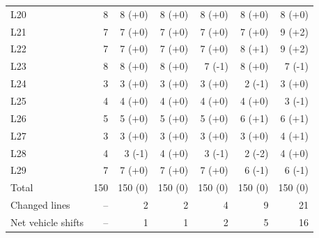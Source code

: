 \documentclass[a4paper,fleqn]{cas-sc}
\begin{document}
\begin{table}[p]
\begin{tabular}{lrrrrrr}
L20 & 8 & 8 (+0) & 8 (+0) & 8 (+0) & 8 (+0) & 8 (+0) \\
L21 & 7 & 7 (+0) & 7 (+0) & 7 (+0) & 7 (+0) & 9 (+2) \\
L22 & 7 & 7 (+0) & 7 (+0) & 7 (+0) & 8 (+1) & 9 (+2) \\
L23 & 8 & 8 (+0) & 8 (+0) & 7 (-1) & 8 (+0) & 7 (-1) \\
L24 & 3 & 3 (+0) & 3 (+0) & 3 (+0) & 2 (-1) & 3 (+0) \\
L25 & 4 & 4 (+0) & 4 (+0) & 4 (+0) & 4 (+0) & 3 (-1) \\
L26 & 5 & 5 (+0) & 5 (+0) & 5 (+0) & 6 (+1) & 6 (+1) \\
L27 & 3 & 3 (+0) & 3 (+0) & 3 (+0) & 3 (+0) & 4 (+1) \\
L28 & 4 & 3 (-1) & 4 (+0) & 3 (-1) & 2 (-2) & 4 (+0) \\
L29 & 7 & 7 (+0) & 7 (+0) & 7 (+0) & 6 (-1) & 6 (-1) \\
\midrule
Total & 150 & 150 (0) & 150 (0) & 150 (0) & 150 (0) & 150 (0) \\
Changed lines & -- & 2 & 2 & 4 & 9 & 21 \\
Net vehicle shifts & -- & 1 & 1 & 2 & 5 & 16 \\
\bottomrule
\end{tabular}
\end{table}
\FloatBarrier
\end{document}

